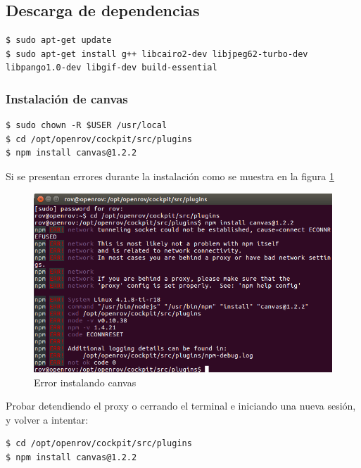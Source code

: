 \subsection{Descarga de dependencias}
\begin{verbatim}
$ sudo apt-get update
$ sudo apt-get install g++ libcairo2-dev libjpeg62-turbo-dev 
libpango1.0-dev libgif-dev build-essential 
\end{verbatim}

\subsubsection{Instalación de canvas}
\begin{verbatim}
$ sudo chown -R $USER /usr/local
$ cd /opt/openrov/cockpit/src/plugins
$ npm install canvas@1.2.2    
\end{verbatim}

Si se presentan errores durante la instalación como se muestra en la figura \ref{fig:ErrorCanvas} 

        \begin{figure}[H]
            \centering
            \includegraphics[scale=0.60]{partes/ImgSophia/ApendiceB/errorInstalandoCanvas.png}
            \caption{Error instalando canvas}
            \label{fig:ErrorCanvas}
        \end{figure}

Probar detendiendo el proxy o cerrando el terminal e iniciando una nueva sesión, y volver a intentar:
\begin{verbatim}
$ cd /opt/openrov/cockpit/src/plugins
$ npm install canvas@1.2.2    
\end{verbatim}

